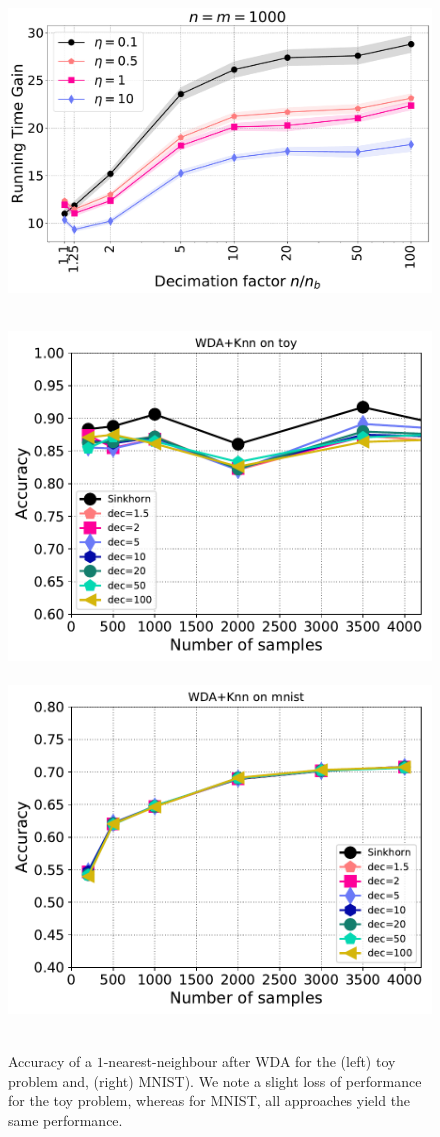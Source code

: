 \begin{figure}[htbp]
	\centering
	\includegraphics[width=6.cm]{./figs/timegain_Screenkhorn_Greenkhorn.pdf}
	\caption{}
\end{figure}


\begin{figure}[htbp]
	\centering
	~\hfill~\includegraphics[width=6.cm]{./figs/wda_accur_toy.pdf}~\hfill~
	\includegraphics[width=6.cm]{./figs/wda_accur_mnist.pdf}~\hfill~\\
	\caption{Accuracy of a $1$-nearest-neighbour after WDA for the (left) toy problem and, (right) MNIST). We note a slight loss of performance for the toy problem, whereas for MNIST, all approaches yield the same performance. 
		\label{fig:wda_gain}}
\end{figure}


